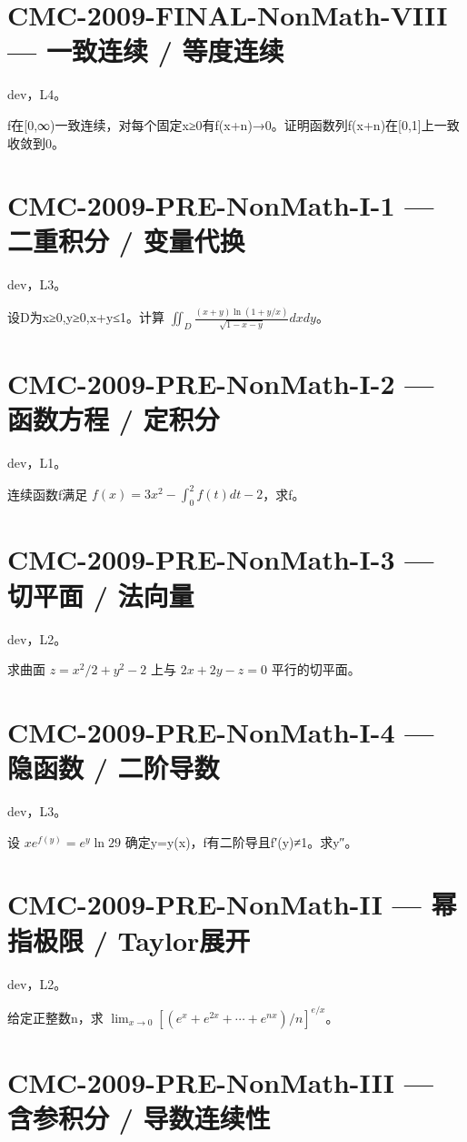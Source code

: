 \documentclass[UTF8]{ctexart}
\begin{document}
\section*{CMC-2009-FINAL-NonMath-VIII — 一致连续 / 等度连续}

dev，L4。

f在[0,∞)一致连续，对每个固定x≥0有f(x+n)→0。证明函数列f(x+n)在[0,1]上一致收敛到0。

\section*{CMC-2009-PRE-NonMath-I-1 — 二重积分 / 变量代换}

dev，L3。

设D为x≥0,y≥0,x+y≤1。计算 $\iint_D\frac{(x+y)\ln(1+y/x)}{\sqrt{1-x-y}}dxdy$。

\section*{CMC-2009-PRE-NonMath-I-2 — 函数方程 / 定积分}

dev，L1。

连续函数f满足 $f(x)=3x^2-\int_0^2f(t)dt-2$，求f。

\section*{CMC-2009-PRE-NonMath-I-3 — 切平面 / 法向量}

dev，L2。

求曲面 $z=x^2/2+y^2-2$ 上与 $2x+2y-z=0$ 平行的切平面。

\section*{CMC-2009-PRE-NonMath-I-4 — 隐函数 / 二阶导数}

dev，L3。

设 $xe^{f(y)}=e^y\ln29$ 确定y=y(x)，f有二阶导且f′(y)≠1。求y″。

\section*{CMC-2009-PRE-NonMath-II — 幂指极限 / Taylor展开}

dev，L2。

给定正整数n，求 $\lim_{x\to0}[(e^x+e^{2x}+\cdots+e^{nx})/n]^{e/x}$。

\section*{CMC-2009-PRE-NonMath-III — 含参积分 / 导数连续性}
\end{document}

